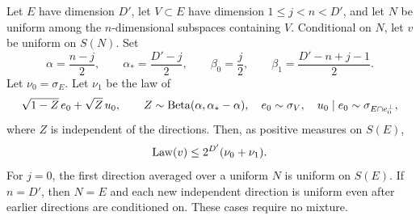 \begin{lemma}\label{s:mixture}
Let \(E\) have dimension \(D'\), let \(V\subset E\) have dimension
\(1\le j<n<D'\), and let \(N\) be uniform among the \(n\)-dimensional
subspaces containing \(V\). Conditional on \(N\), let \(v\) be
uniform on \(S(N)\). Set
\[
 \alpha=\frac{n-j}{2},\qquad
 \alpha_*=\frac{D'-j}{2},\qquad
 \beta_0=\frac j2,\qquad
 \beta_1=\frac{D'-n+j-1}{2}.
\]
Let \(\nu_0=\sigma_E\). Let \(\nu_1\) be the law of
\begin{equation}\label{s:mixture-construction}
 \sqrt{1-Z}\,e_0+\sqrt Z\,u_0,\qquad
 Z\sim\operatorname{Beta}(\alpha,\alpha_*-\alpha),\quad
 e_0\sim\sigma_V,\quad
 u_0\mid e_0\sim\sigma_{E\cap e_0^\perp},
\end{equation}
where \(Z\) is independent of the directions. Then, as positive
measures on \(S(E)\),
\begin{equation}\label{s:mixture-domination}
 \operatorname{Law}(v)\le2^{D'}(\nu_0+\nu_1).
\end{equation}
For \(j=0\), the first direction averaged over a uniform \(N\) is
uniform on \(S(E)\). If \(n=D'\), then \(N=E\) and each new
independent direction is uniform even after earlier directions are
conditioned on. These cases require no mixture.
\end{lemma}
